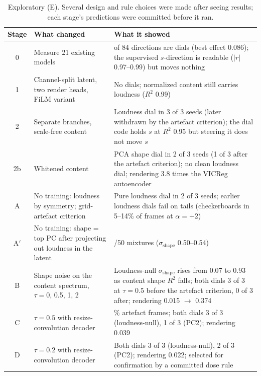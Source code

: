 \documentclass[10pt]{article}
\begin{document}
\begin{table}[htbp]
\centering
\small
\caption{Exploratory (E). Several design and rule choices were made after seeing results; each stage's predictions were committed before it ran.}
\label{tab:C1}
\begin{tabularx}{\linewidth}{c>{\raggedright\arraybackslash}X>{\raggedright\arraybackslash}X}
\toprule
Stage & What changed & What it showed \\
\midrule
0 & Measure 21 existing models & 0 of 84 directions are dials (best effect 0.086); the supervised $s$-direction is readable ($|r|$ 0.97--0.99) but moves nothing \\
1 & Channel-split latent, two render heads, FiLM variant & No dials; normalized content still carries loudness ($R^2$ 0.99) \\
2 & Separate branches, scale-free content & Loudness dial in 3 of 3 seeds (later withdrawn by the artefact criterion); the dial code holds $s$ at $R^2$ 0.95 but steering it does not move $s$ \\
2b & Whitened content & PCA shape dial in 2 of 3 seeds (1 of 3 after the artefact criterion); no clean loudness dial; rendering 3.8 times the VICReg autoencoder \\
A & No training: loudness by symmetry; grid-artefact criterion & Pure loudness dial in 2 of 3 seeds; earlier loudness dials fail on tails (checkerboards in 5--14\% of frames at $\alpha = +2$) \\
A$'$ & No training: shape = top PC after projecting out loudness in the latent & 50/50 mixtures ($\sigma_{\mathrm{shape}}$ 0.50--0.54) \\
B & Shape noise on the content spectrum, $\tau = 0$, 0.5, 1, 2 & Loudness-null $\sigma_{\mathrm{shape}}$ rises from 0.07 to 0.93 as content shape $R^2$ falls; both dials 3 of 3 at $\tau = 0.5$ before the artefact criterion, 0 of 3 after; rendering 0.015 $\rightarrow$ 0.374 \\
C & $\tau = 0.5$ with resize-convolution decoder & 0.0\% artefact frames; both dials 3 of 3 (loudness-null), 1 of 3 (PC2); rendering 0.039 \\
D & $\tau = 0.2$ with resize-convolution decoder & Both dials 3 of 3 (loudness-null), 2 of 3 (PC2); rendering 0.022; selected for confirmation by a committed dose rule \\
\bottomrule
\end{tabularx}
\end{table}
\end{document}
